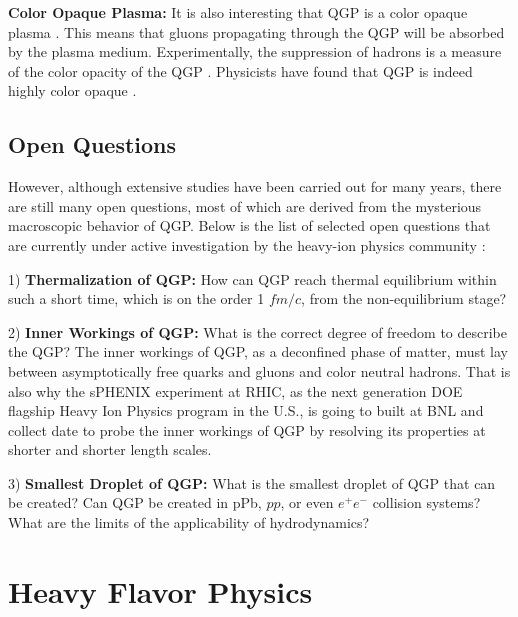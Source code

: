 \textbf{Color Opaque Plasma:} It is also interesting that QGP is a color opaque plasma \cite{QGPGen}. This means that gluons propagating through the QGP will be absorbed by the plasma medium. Experimentally, the suppression of hadrons is a measure of the color opacity of the QGP \cite{QGPGen}. Physicists have found that QGP is indeed highly color opaque \cite{QGPOpaque}.




 


\subsection{Open Questions}

However, although extensive studies have been carried out for many years, there are still many open questions, most of which are derived from the mysterious macroscopic behavior of QGP. Below is the list of selected open questions that are currently under active investigation by the heavy-ion physics community \cite{BigQuestions}:

1) \textbf{Thermalization of QGP:} How can QGP reach thermal equilibrium within such a short time, which is on the order 1 $fm/c$, from the non-equilibrium stage?

2) \textbf{Inner Workings of QGP:} What is the correct degree of freedom to describe the QGP? The inner workings of QGP, as a deconfined phase of matter, must lay between asymptotically free quarks and gluons and color neutral hadrons. That is also why the sPHENIX experiment at RHIC, as the next generation DOE flagship Heavy Ion Physics program in the U.S., is going to built at BNL and collect date to probe the inner workings of QGP by resolving its properties at shorter and shorter length scales. 

3) \textbf{Smallest Droplet of QGP:} What is the smallest droplet of QGP that can be created? Can QGP be created in pPb, $pp$, or even $e^+e^-$ collision systems? What are the limits of the applicability of hydrodynamics?

\section{Heavy Flavor Physics}


